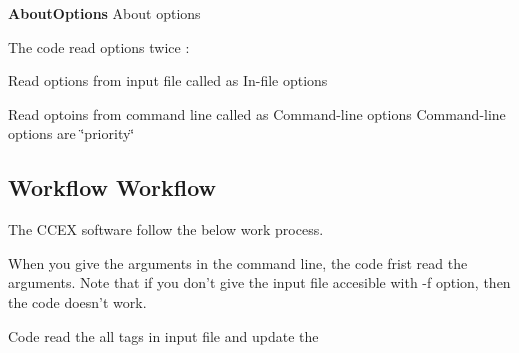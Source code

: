 {\bfseries About\-Options} About options {\bfseries } 

The code read options twice \-:
\begin{DoxyItemize}
\item Read options from input file called as In-\/file options
\item Read optoins from command line called as Command-\/line options Command-\/line options are \char`\"{}priority\char`\"{}
\end{DoxyItemize}

\subsection*{Workflow Workflow}

The C\-C\-E\-X software follow the below work process.

When you give the arguments in the command line, the code frist read the arguments. Note that if you don't give the input file accesible with -\/f option, then the code doesn't work.

Code read the all tags in input file and update the

 